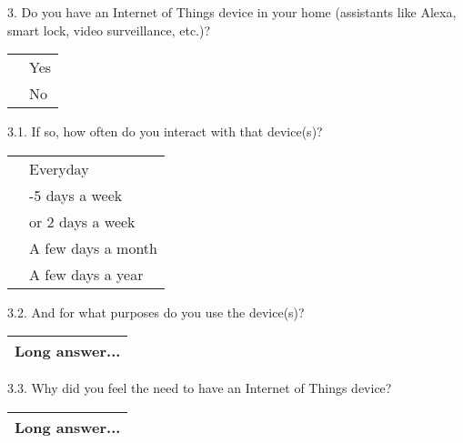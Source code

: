 3. Do you have an Internet of Things device in your home (assistants like Alexa, smart lock, video surveillance, etc.)?

\vspace{0.6cm}
\begin{center}
    \noindent\begin{tabularx}{0.8\textwidth}{ >{\centering\arraybackslash}X >{\raggedright\arraybackslash}X }
        {\huge $\circ$} & Yes \\[0.2cm]
        {\huge $\circ$} & No
    \end{tabularx}
\end{center}
\vspace{0.6cm}

3.1. If so, how often do you interact with that device(s)?

\vspace{0.6cm}
\begin{center}
    \noindent\begin{tabularx}{0.8\textwidth}{ >{\centering\arraybackslash}X >{\raggedright\arraybackslash}X }
        {\huge $\circ$} & Everyday \\[0.2cm]
        {\huge $\circ$} & 2-5 days a week \\[0.2cm]
        {\huge $\circ$} & 1 or 2 days a week \\[0.2cm]
        {\huge $\circ$} & A few days a month \\[0.2cm]
        {\huge $\circ$} & A few days a year
    \end{tabularx}
\end{center}
\vspace{0.6cm}

3.2. And for what purposes do you use the device(s)?

\vspace{0.6cm}
\begin{center}
    \noindent\begin{tabularx}{0.9\textwidth}{ |>{\raggedright\arraybackslash}X| }
        \hline
        \hspace{0.2cm}Long answer...\vspace{1.75cm} \\
        \hline
    \end{tabularx}
\end{center}
\vspace{0.6cm}

3.3. Why did you feel the need to have an Internet of Things device?

\vspace{0.6cm}
\begin{center}
    \noindent\begin{tabularx}{0.9\textwidth}{ |>{\raggedright\arraybackslash}X| }
        \hline
        \hspace{0.2cm}Long answer...\vspace{1.75cm} \\
        \hline
    \end{tabularx}
\end{center}
\vspace{0.6cm}

